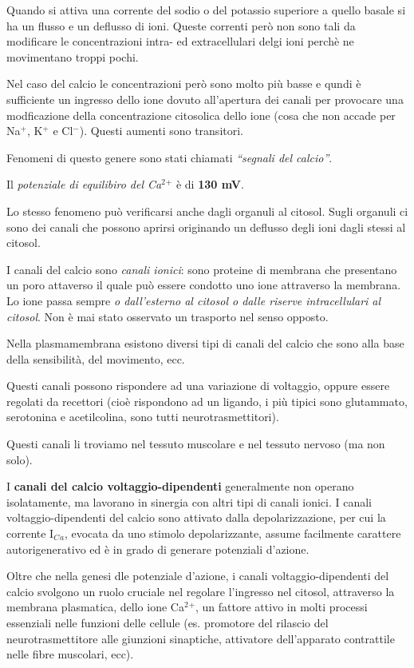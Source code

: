 \documentclass[]{article}
\begin{document}
Quando si attiva una corrente del sodio o del potassio superiore a
quello basale si ha un flusso e un deflusso di ioni. Queste correnti
però non sono tali da modificare le concentrazioni intra- ed
extracellulari delgi ioni perchè ne movimentano troppi pochi.

Nel caso del calcio le concentrazioni però sono molto più basse e qundi
è sufficiente un ingresso dello ione dovuto all'apertura dei canali per
provocare una modficazione della concentrazione citosolica dello ione
(cosa che non accade per Na\(^+\), K\(^+\) e Cl\(^-\)). Questi aumenti
sono transitori.

Fenomeni di questo genere sono stati chiamati \emph{``segnali del
calcio''}.

Il \emph{potenziale di equilibiro del Ca\(^2\)\(^+\)} è di \textbf{130
mV}.

Lo stesso fenomeno può verificarsi anche dagli organuli al citosol.
Sugli organuli ci sono dei canali che possono aprirsi originando un
deflusso degli ioni dagli stessi al citosol.

I canali del calcio sono \emph{canali ionici}: sono proteine di membrana
che presentano un poro attaverso il quale può essere condotto uno ione
attraverso la membrana. Lo ione passa sempre \emph{o dall'esterno al
citosol o dalle riserve intracellulari al citosol}. Non è mai stato
osservato un trasporto nel senso opposto.

Nella plasmamembrana esistono diversi tipi di canali del calcio che sono
alla base della sensibilità, del movimento, ecc.

Questi canali possono rispondere ad una variazione di voltaggio, oppure
essere regolati da recettori (cioè rispondono ad un ligando, i più
tipici sono glutammato, serotonina e acetilcolina, sono tutti
neurotrasmettitori).

Questi canali li troviamo nel tessuto muscolare e nel tessuto nervoso
(ma non solo).

I \textbf{canali del calcio voltaggio-dipendenti} generalmente non
operano isolatamente, ma lavorano in sinergia con altri tipi di canali
ionici. I canali voltaggio-dipendenti del calcio sono attivato dalla
depolarizzazione, per cui la corrente I\(_C\)\(_a\), evocata da uno
stimolo depolarizzante, assume facilmente carattere autorigenerativo ed
è in grado di generare potenziali d'azione.

Oltre che nella genesi dle potenziale d'azione, i canali
voltaggio-dipendenti del calcio svolgono un ruolo cruciale nel regolare
l'ingresso nel citosol, attraverso la membrana plasmatica, dello ione
Ca\(^2\)\(^+\), un fattore attivo in molti processi essenziali nelle
funzioni delle cellule (es. promotore del rilascio del
neurotrasmettitore alle giunzioni sinaptiche, attivatore dell'apparato
contrattile nelle fibre muscolari, ecc).
\end{document}
